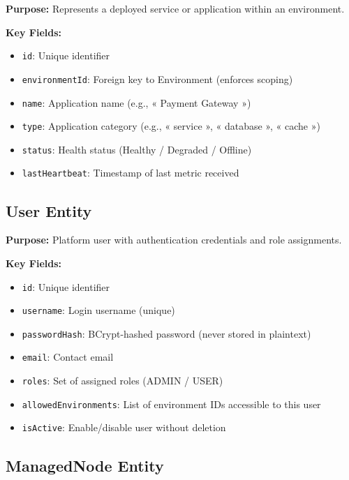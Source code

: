 \documentclass[12pt,a4paper]{report}
\begin{document}
\begin{tcolorbox}
  \textbf{Purpose:} Represents a deployed service or application within an environment.
  
  \textbf{Key Fields:}
  \begin{itemize}
    \item \texttt{id}: Unique identifier
    \item \texttt{environmentId}: Foreign key to Environment (enforces scoping)
    \item \texttt{name}: Application name (e.g., « Payment Gateway »)
    \item \texttt{type}: Application category (e.g., « service », « database », « cache »)
    \item \texttt{status}: Health status (Healthy / Degraded / Offline)
    \item \texttt{lastHeartbeat}: Timestamp of last metric received
  \end{itemize}
\end{tcolorbox}

\subsection{User Entity}

\begin{tcolorbox}
  \textbf{Purpose:} Platform user with authentication credentials and role assignments.
  
  \textbf{Key Fields:}
  \begin{itemize}
    \item \texttt{id}: Unique identifier
    \item \texttt{username}: Login username (unique)
    \item \texttt{passwordHash}: BCrypt-hashed password (never stored in plaintext)
    \item \texttt{email}: Contact email
    \item \texttt{roles}: Set of assigned roles (ADMIN / USER)
    \item \texttt{allowedEnvironments}: List of environment IDs accessible to this user
    \item \texttt{isActive}: Enable/disable user without deletion
  \end{itemize}
\end{tcolorbox}

\subsection{ManagedNode Entity}
\end{document}
